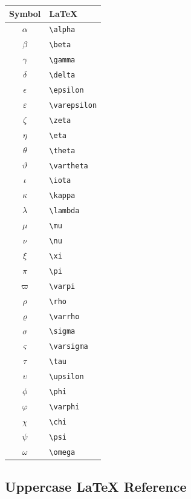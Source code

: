 \begin{center}
\begin{tabular}{c|l}
\textbf{Symbol} & \textbf{LaTeX} \\ \hline
\(\alpha\) & \verb|\alpha| \\
\(\beta\) & \verb|\beta| \\
\(\gamma\) & \verb|\gamma| \\
\(\delta\) & \verb|\delta| \\
\(\epsilon\) & \verb|\epsilon| \\
\(\varepsilon\) & \verb|\varepsilon| \\
\(\zeta\) & \verb|\zeta| \\
\(\eta\) & \verb|\eta| \\
\(\theta\) & \verb|\theta| \\
\(\vartheta\) & \verb|\vartheta| \\
\(\iota\) & \verb|\iota| \\
\(\kappa\) & \verb|\kappa| \\
\(\lambda\) & \verb|\lambda| \\
\(\mu\) & \verb|\mu| \\
\(\nu\) & \verb|\nu| \\
\(\xi\) & \verb|\xi| \\
\(\pi\) & \verb|\pi| \\
\(\varpi\) & \verb|\varpi| \\
\(\rho\) & \verb|\rho| \\
\(\varrho\) & \verb|\varrho| \\
\(\sigma\) & \verb|\sigma| \\
\(\varsigma\) & \verb|\varsigma| \\
\(\tau\) & \verb|\tau| \\
\(\upsilon\) & \verb|\upsilon| \\
\(\phi\) & \verb|\phi| \\
\(\varphi\) & \verb|\varphi| \\
\(\chi\) & \verb|\chi| \\
\(\psi\) & \verb|\psi| \\
\(\omega\) & \verb|\omega|
\end{tabular}
\end{center}

\subsection{Uppercase LaTeX Reference}
\label{subsec:uppercase-greek-latex-reference}

